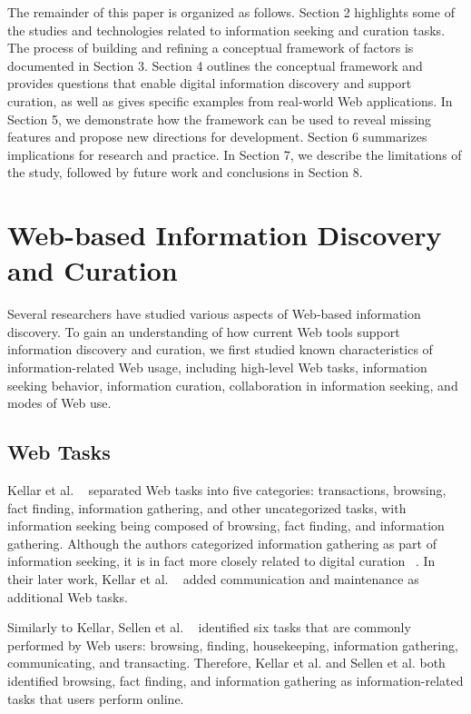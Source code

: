 \documentclass{casconpaper}
\begin{document}
{The remainder of this paper is organized as follows. Section 2 highlights some of the studies and technologies related to information seeking and curation tasks. The process of building and refining a conceptual framework of factors is documented in Section 3. Section 4 outlines the conceptual framework and provides questions that enable digital information discovery and support curation, as well as gives specific examples from real-world Web applications. In Section 5, we demonstrate how the framework can be used to reveal missing features and propose new directions for development. Section 6 summarizes implications for research and practice. In Section 7, we describe the limitations of the study, followed by future work and conclusions in Section 8.

} %


{\section{Web-based Information Discovery and Curation}

Several researchers have studied various aspects of Web-based information discovery. To gain an understanding of how current Web tools support information discovery and curation, we first studied known characteristics of information-related Web usage, including high-level Web tasks, information seeking behavior, information curation, collaboration in information seeking, and modes of Web use.  

{\subsection{Web Tasks}

Kellar et al. ~\cite{kellar2006} separated Web tasks into five categories: transactions, browsing, fact finding, information gathering, and other uncategorized tasks, with information seeking being composed of browsing, fact finding, and information gathering. Although the authors categorized information gathering as part of information seeking, it is in fact more closely related to digital curation ~\cite{beagrie, wittaker}. In their later work, Kellar et al. ~\cite{kellar2007} added communication and maintenance as additional Web tasks. 

Similarly to Kellar, Sellen et al. ~\cite{sellen} identified six tasks that are commonly performed by Web users: browsing, finding, housekeeping, information gathering, communicating, and transacting. Therefore, Kellar et al. and Sellen et al. both identified browsing, fact finding, and information gathering as information-related tasks that users perform online.   

}}
\end{document}
